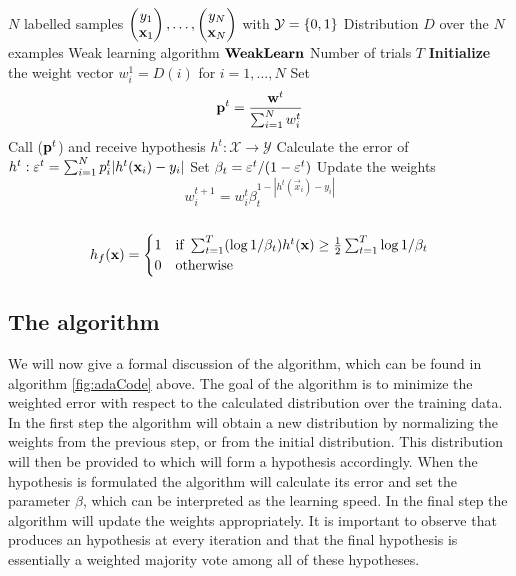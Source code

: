\begin{algorithm} 
\caption{\adaB}
\label{fig:adaCode}
	\begin{algorithmic}[1]
	\Require 
	\Statex $N$ labelled samples $\Vec{y_1\\ \mathbf x_1},\ldots,\Vec{y_N\\ \mathbf x_N}$  with $\mathcal Y = \set{0,1}$ 
	\Statex Distribution $D$ over the $N$ examples
	\Statex Weak learning algorithm $\weak$
	\Statex Number of trials $T$
	\State \textbf{Initialize} the weight vector $w_i^1=D(i)$ for $i=1,\ldots,N$
	\State Set $$\bf p^t= \frac{\bf w^t}{\sum_{i=1}^N w^t_i}$$
	\State Call \weak($\bf p^t$) and receive hypothesis $h^t:\mathcal X\to\mathcal Y$
	\State Calculate the error of $h^t:\ve^t=\sum^N_{i=1}p^t_i|h^t(\mathbf x_i)-y_i|$\label{algStep:adaErr}
	\State Set $\b_t=\ve^t/(1-\ve^t)$
	\State Update the weights $$w_i^{t+1}=w_i^t\beta^{1-|h^t(\vec x_i)-y_i|}_t$$
	\EndFor\\
	\Return $$h_f(\mathbf x)=\begin{cases}1 & \text{if } \sum^T_{t=1}(\log1/\b_t)h^t(\mathbf x)\geq\frac12\sum^T_{t=1}\log1/\b_t\\0&\text{otherwise}\end{cases}$$
	\EndProcedure
	\end{algorithmic}
\end{algorithm}
\vspace{-5pt}
\subsection{The algorithm}
\label{subsec:AdaAlgo}
We will now give a formal discussion of the \adaB\cite{Freund1997} algorithm, which can be found in algorithm \ref{fig:adaCode} above. The goal of the algorithm is to minimize the weighted error with respect to the calculated distribution 
over the training data. In the first step the algorithm will obtain a new distribution by normalizing the weights from the previous step, or from the initial distribution. This distribution will then be provided to \weak which will form a hypothesis accordingly. When the hypothesis is formulated the algorithm will calculate its error and set the parameter $\beta$, which can be interpreted as the learning speed. In the final step the algorithm will update the weights appropriately. It is important to observe that \weak produces an hypothesis at every iteration and that the final hypothesis is essentially a weighted majority vote among all of these hypotheses. \par

